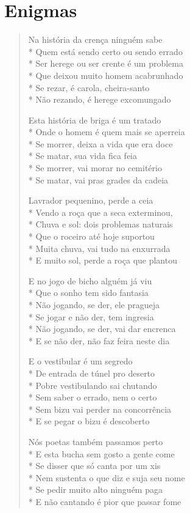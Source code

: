\chapter{Enigmas}

\begin{verse}
Na história da crença ninguém sabe\\*
Quem está sendo certo ou sendo errado\\*
Ser herege ou ser crente é um problema\\*
Que deixou muito homem acabrunhado\\*
Se rezar, é carola, cheira-santo\\*
Não rezando, é herege excomungado

Esta história de briga é um tratado\\*
Onde o homem é quem mais se aperreia\\*
Se morrer, deixa a vida que era doce\\*
Se matar, sua vida fica feia\\*
Se morrer, vai morar no cemitério\\*
Se matar, vai pras grades da cadeia

Lavrador pequenino, perde a ceia\\*
Vendo a roça que a seca exterminou,\\*
Chuva e sol: dois problemas naturais\\*
Que o roceiro até hoje suportou\\*
Muita chuva, vai tudo na enxurrada\\*
E muito sol, perde a roça que plantou

E no jogo de bicho alguém já viu\\*
Que o sonho tem sido fantasia\\*
Não jogando, se der, ele pragueja\\*
Se jogar e não der, tem ingresia\\*
Não jogando, se der, vai dar encrenca\\*
E se não der, não faz feira neste dia

E o vestibular é um segredo\\*
De entrada de túnel pro deserto\\*
Pobre vestibulando sai chutando\\*
Sem saber o errado, nem o certo\\*
Sem bizu vai perder na concorrência\\*
E se pegar o bizu é descoberto

Nós poetas também passamos perto\\*
E esta bucha sem gosto a gente come\\*
Se disser que só canta por um xis\\*
Nem sustenta o que diz e suja seu nome\\*
Se pedir muito alto ninguém paga\\*
E não cantando é pior que passar fome


\end{verse}
